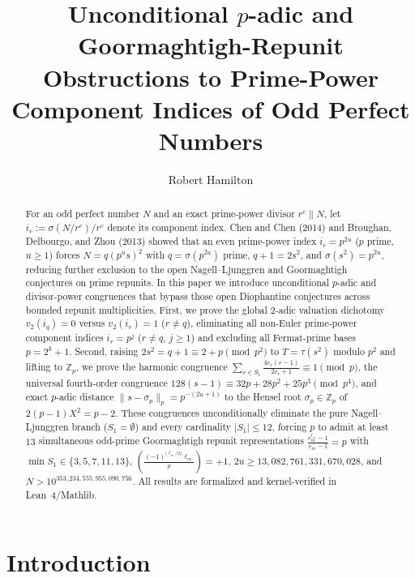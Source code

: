 \documentclass[11pt]{amsart}
\title[Unconditional $p$-adic Obstructions to Prime-Power Component Indices]{Unconditional $p$-adic and Goormaghtigh-Repunit Obstructions to Prime-Power Component Indices of Odd Perfect Numbers}
\author{Robert Hamilton}
\theoremstyle{definition}
\theoremstyle{remark}
\begin{document}
\begin{abstract}
For an odd perfect number $N$ and an exact prime-power divisor $r^e \parallel N$, let $i_r := \sigma(N/r^e)/r^e$ denote its component index. Chen and Chen (2014) and Broughan, Delbourgo, and Zhou (2013) showed that an even prime-power index $i_r = p^{2u}$ ($p$ prime, $u \ge 1$) forces $N = q(p^u s)^2$ with $q = \sigma(p^{2u})$ prime, $q + 1 = 2s^2$, and $\sigma(s^2) = p^{2u}$, reducing further exclusion to the open Nagell--Ljunggren and Goormaghtigh conjectures on prime repunits. In this paper we introduce unconditional $p$-adic and divisor-power congruences that bypass those open Diophantine conjectures across bounded repunit multiplicities. First, we prove the global $2$-adic valuation dichotomy $v_2(i_q) = 0$ versus $v_2(i_r) = 1$ ($r \ne q$), eliminating all non-Euler prime-power component indices $i_r = p^j$ ($r \ne q$, $j \ge 1$) and excluding all Fermat-prime bases $p = 2^k + 1$. Second, raising $2s^2 = q + 1 \equiv 2 + p \pmod{p^2}$ to $T = \tau(s^2)$ modulo $p^2$ and lifting to $\mathbb{Z}_p$, we prove the harmonic congruence $\sum_{r \in S_1} \frac{4 e_r (r - 1)}{2 e_r + 1} \equiv 1 \pmod p$, the universal fourth-order congruence $128(s - 1) \equiv 32p + 28p^2 + 25p^3 \pmod{p^4}$, and exact $p$-adic distance $\|s - \sigma_p\|_p = p^{-(2u+1)}$ to the Hensel root $\sigma_p \in \mathbb{Z}_p$ of $2(p-1)X^2 = p - 2$. These congruences unconditionally eliminate the pure Nagell--Ljunggren branch ($S_1 = \emptyset$) and every cardinality $|S_1| \le 12$, forcing $p$ to admit at least $13$ simultaneous odd-prime Goormaghtigh repunit representations $\frac{r_m^{\ell_m} - 1}{r_m - 1} = p$ with $\min S_1 \in \{3, 5, 7, 11, 13\}$, $\left(\frac{(-1)^{\lfloor \ell_m/2 \rfloor}\ell_m}{p}\right) = +1$, $2u \ge 13{,}082{,}761{,}331{,}670{,}028$, and $N > 10^{353{,}234{,}555{,}955{,}090{,}756}$. All results are formalized and kernel-verified in Lean~4/Mathlib.
\end{abstract}

\maketitle

\section{Introduction}
\end{document}
